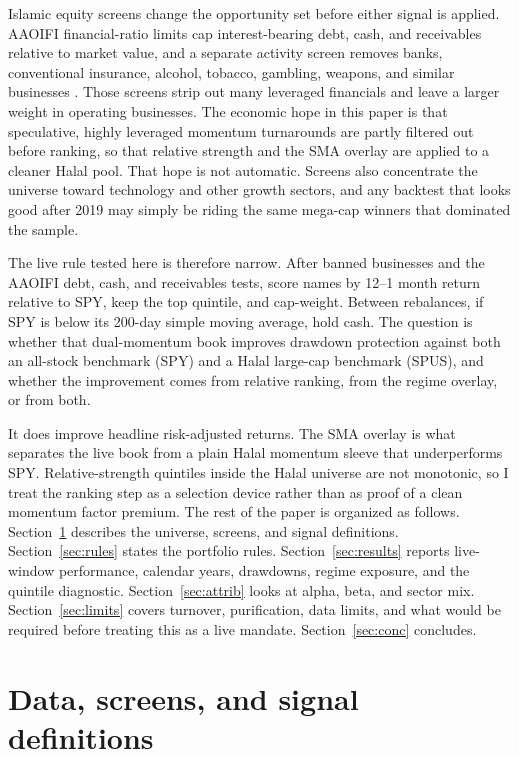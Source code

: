 \documentclass[11pt,letterpaper]{article}
\begin{document}
Islamic equity screens change the opportunity set before either signal is applied. AAOIFI financial-ratio limits cap interest-bearing debt, cash, and receivables relative to market value, and a separate activity screen removes banks, conventional insurance, alcohol, tobacco, gambling, weapons, and similar businesses \citep{aaoifi21,derigs2008}. Those screens strip out many leveraged financials and leave a larger weight in operating businesses. The economic hope in this paper is that speculative, highly leveraged momentum turnarounds are partly filtered out before ranking, so that relative strength and the SMA overlay are applied to a cleaner Halal pool. That hope is not automatic. Screens also concentrate the universe toward technology and other growth sectors, and any backtest that looks good after 2019 may simply be riding the same mega-cap winners that dominated the sample.

The live rule tested here is therefore narrow. After banned businesses and the AAOIFI debt, cash, and receivables tests, score names by 12--1 month return relative to SPY, keep the top quintile, and cap-weight. Between rebalances, if SPY is below its 200-day simple moving average, hold cash. The question is whether that dual-momentum book improves drawdown protection against both an all-stock benchmark (SPY) and a Halal large-cap benchmark (SPUS), and whether the improvement comes from relative ranking, from the regime overlay, or from both.

It does improve headline risk-adjusted returns. The SMA overlay is what separates the live book from a plain Halal momentum sleeve that underperforms SPY. Relative-strength quintiles inside the Halal universe are not monotonic, so I treat the ranking step as a selection device rather than as proof of a clean momentum factor premium. The rest of the paper is organized as follows. Section~\ref{sec:data} describes the universe, screens, and signal definitions. Section~\ref{sec:rules} states the portfolio rules. Section~\ref{sec:results} reports live-window performance, calendar years, drawdowns, regime exposure, and the quintile diagnostic. Section~\ref{sec:attrib} looks at alpha, beta, and sector mix. Section~\ref{sec:limits} covers turnover, purification, data limits, and what would be required before treating this as a live mandate. Section~\ref{sec:conc} concludes.

\section{Data, screens, and signal definitions}
\label{sec:data}
\end{document}
